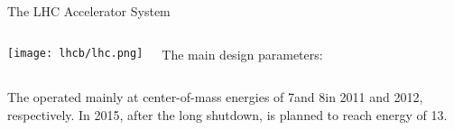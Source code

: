 \begin{frame}[t]{The LHC Accelerator System}
\centering
\begin{columns}
\texttt{[image: lhcb/lhc.png]}

The main \lhc design parameters:
\end{columns}
\bigskip
The \lhc operated mainly at center-of-mass energies of 7\tev and 8\tev in 2011
and 2012, respectively. In 2015, after the long  shutdown, \lhc is planned to
reach energy of 13\tev.
\end{frame}